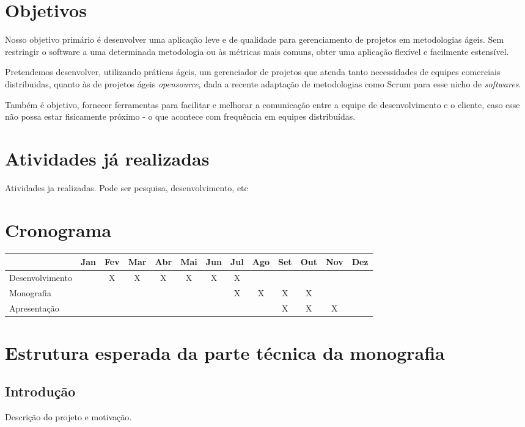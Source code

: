 \documentclass[titlepage]{article}
\begin{document}
\section{Objetivos}
Nosso objetivo primário é desenvolver uma aplicação leve e de qualidade para gerenciamento de projetos em metodologias ágeis. Sem restringir o software a uma determinada metodologia ou às métricas mais comuns, obter uma aplicação flexível e facilmente estensível.

Pretendemos desenvolver, utilizando práticas ágeis, um gerenciador de projetos que atenda tanto necessidades de equipes comerciais distribuidas, quanto às de projetos ágeis \textit{opensource}, dada a recente adaptação de metodologias como Scrum para esse nicho de \textit{softwares}.

Também é objetivo, fornecer ferramentas para facilitar e melhorar a comunicação entre a equipe de desenvolvimento e o cliente, caso esse não possa estar fisicamente próximo - o que acontece com frequência em equipes distribuídas.

\section{Atividades já realizadas}
Atividades ja realizadas. Pode ser pesquisa, desenvolvimento, etc

\section{Cronograma}
\begin{tabular}{|l|c|c|c|c|c|c|c|c|c|c|c|c|}
  \hline
  & Jan & Fev & Mar & Abr & Mai & Jun & Jul & Ago & Set & Out & Nov & Dez \\ \hline
  Desenvolvimento	&  & X & X & X & X & X & X &  &  &  &  & \\ \hline
  Monografia &  &  &  &  &  &  & X & X & X & X &  & \\ \hline
  Apresentação &  &  &  &  &  &  &  &  & X & X & X & \\ \hline
\end{tabular}

\section{Estrutura esperada da parte técnica da monografia}

\subsection{Introdução}
Descrição do projeto e motivação.
\end{document}
